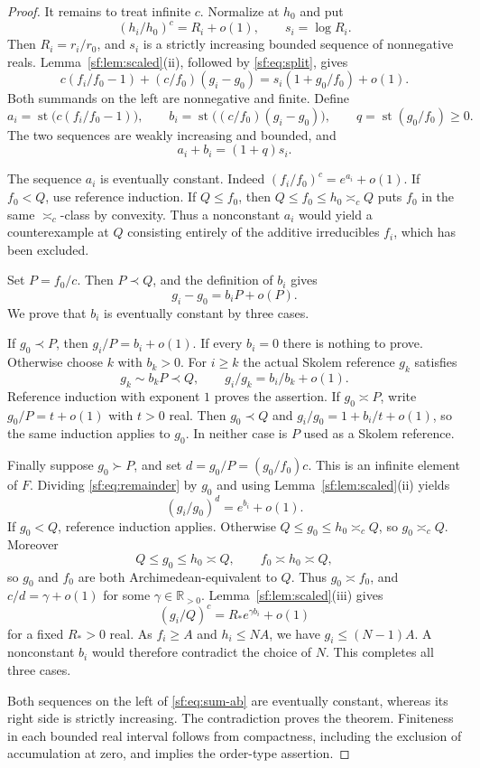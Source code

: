 \documentclass[11pt]{article}
\theoremstyle{definition}
\theoremstyle{remark}
\newcommand{\R}{\mathbb R}
\newcommand{\st}{\operatorname{st}}
\newcommand{\arch}{\mathrel{\asymp}}
\numberwithin{equation}{section}
\begin{document}
\begin{proof}
It remains to treat infinite $c$. Normalize at $h_0$ and put
\[
 (h_i/h_0)^c=R_i+o(1),\qquad s_i=\log R_i.
\]
Then $R_i=r_i/r_0$, and $s_i$ is a strictly increasing bounded
sequence of nonnegative reals. Lemma~\ref{sf:lem:scaled}(ii), followed
by \eqref{sf:eq:split}, gives
\[
 c(f_i/f_0-1)+(c/f_0)(g_i-g_0)
       =s_i(1+g_0/f_0)+o(1).
\]
Both summands on the left are nonnegative and finite. Define
\begin{equation}
 a_i=\st\bigl(c(f_i/f_0-1)\bigr),\qquad
 b_i=\st\bigl((c/f_0)(g_i-g_0)\bigr),\qquad
 q=\st(g_0/f_0)\ge0.
 \label{sf:eq:ab}
\end{equation}
The two sequences are weakly increasing and bounded, and
\begin{equation}
 a_i+b_i=(1+q)s_i.\label{sf:eq:sum-ab}
\end{equation}

The sequence $a_i$ is eventually constant. Indeed
$(f_i/f_0)^c=e^{a_i}+o(1)$. If $f_0<Q$, use reference induction.
If $Q\le f_0$, then $Q\le f_0\le h_0\arch_c Q$ puts $f_0$
in the same $\arch_c$-class by convexity. Thus a nonconstant
$a_i$ would yield a counterexample at $Q$ consisting entirely of
the additive irreducibles $f_i$, which has been excluded.

Set $P=f_0/c$. Then $P\prec Q$, and the definition of $b_i$ gives
\begin{equation}
 g_i-g_0=b_iP+o(P).\label{sf:eq:remainder}
\end{equation}
We prove that $b_i$ is eventually constant by three cases.

If $g_0\prec P$, then $g_i/P=b_i+o(1)$. If every $b_i=0$
there is nothing to prove. Otherwise choose $k$ with $b_k>0$.
For $i\ge k$ the actual Skolem reference $g_k$ satisfies
\[
 g_k\sim b_kP\prec Q,\qquad
 g_i/g_k=b_i/b_k+o(1).
\]
Reference induction with exponent $1$ proves the assertion.
If $g_0\arch P$, write $g_0/P=t+o(1)$ with $t>0$ real.
Then $g_0\prec Q$ and
$g_i/g_0=1+b_i/t+o(1)$, so the same induction applies to $g_0$.
In neither case is $P$ used as a Skolem reference.

Finally suppose $g_0\succ P$, and set $d=g_0/P=(g_0/f_0)c$.
This is an infinite element of $F$. Dividing \eqref{sf:eq:remainder}
by $g_0$ and using Lemma~\ref{sf:lem:scaled}(ii) yields
\[
 (g_i/g_0)^d=e^{b_i}+o(1).
\]
If $g_0<Q$, reference induction applies. Otherwise
$Q\le g_0\le h_0\arch_c Q$, so $g_0\arch_c Q$.
Moreover
\[
 Q\le g_0\le h_0\arch Q,\qquad f_0\arch h_0\arch Q,
\]
so $g_0$ and $f_0$ are both Archimedean-equivalent to $Q$.
Thus $g_0\arch f_0$, and $c/d=\gamma+o(1)$ for some
$\gamma\in\R_{>0}$. Lemma~\ref{sf:lem:scaled}(iii) gives
\[
 (g_i/Q)^c=R_*e^{\gamma b_i}+o(1)
\]
for a fixed $R_*>0$ real. As $f_i\ge A$ and $h_i\le NA$,
we have $g_i\le(N-1)A$. A nonconstant $b_i$ would therefore
contradict the choice of $N$. This completes all three cases.

Both sequences on the left of \eqref{sf:eq:sum-ab} are eventually
constant, whereas its right side is strictly increasing. The
contradiction proves the theorem. Finiteness in each bounded real
interval follows from compactness, including the exclusion of
accumulation at zero, and implies the order-type assertion.
\end{proof}
\end{document}
